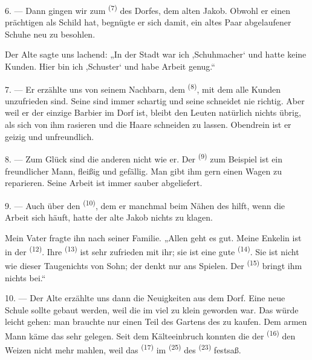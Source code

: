 6. --- Dann gingen wir zum  \textsuperscript{(7)} des Dorfes, dem
alten Jakob. Obwohl er einen prächtigen  als Schild hat, begnügte er
sich damit, ein altes Paar abgelaufener Schuhe neu zu besohlen.

Der Alte sagte uns lachend: „In der Stadt war ich ,Schuhmacher‘ und hatte keine
Kunden. Hier bin ich ,Schuster‘ und habe Arbeit genug.“

7. --- Er erzählte uns von seinem Nachbarn, dem 
\textsuperscript{(8)}, mit dem alle Kunden unzufrieden sind. Seine 
sind immer schartig und seine  schneidet nie richtig. Aber weil er
der einzige Barbier im Dorf ist, bleibt den Leuten natürlich nichts übrig, als sich
von ihm rasieren und die Haare schneiden zu lassen. Obendrein ist er geizig und
unfreundlich.

8. --- Zum Glück sind die anderen  nicht wie er. Der
 \textsuperscript{(9)} zum Beispiel ist ein freundlicher Mann,
fleißig und gefällig. Man gibt ihm gern einen Wagen zu reparieren. Seine Arbeit ist
immer sauber abgeliefert.

9. --- Auch über den  \textsuperscript{(10)}, dem er manchmal beim
Nähen des  hilft, wenn die Arbeit sich häuft, hatte der alte Jakob
nichts zu klagen.

Mein Vater fragte ihn nach seiner Familie. „Allen geht es gut. Meine Enkelin ist in
der  \textsuperscript{(12)}. Ihre 
\textsuperscript{(13)} ist sehr zufrieden mit ihr; sie ist eine gute
 \textsuperscript{(14)}. Sie ist nicht wie dieser Taugenichts von
Sohn; der denkt nur ans Spielen. Der  \textsuperscript{(15)} bringt
ihm nichts bei.“

\VUsaut{3.0mm}
\VUsaut{3.0mm}

10. --- Der Alte erzählte uns dann die Neuigkeiten aus dem Dorf. Eine neue Schule
sollte gebaut werden, weil die im  viel zu klein geworden war.
Das würde leicht gehen: man brauchte nur einen Teil des Gartens des
 zu kaufen. Dem armen Mann käme das sehr gelegen. Seit dem
Kälteeinbruch konnten die  der 
\textsuperscript{(16)} den Weizen nicht mehr mahlen, weil das 
\textsuperscript{(17)} im  \textsuperscript{(25)} des 
\textsuperscript{(23)} festsaß.

